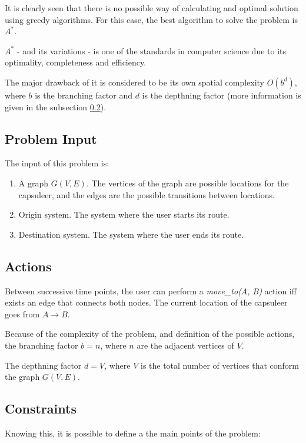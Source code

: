 \documentclass{article}
\theoremstyle{customdef}
\begin{document}
It is clearly seen that there is no possible way of calculating and optimal solution using greedy algorithms. For this case, the best algorithm to solve the problem is $A^*$.

$A^*$ - and its variations - is one of the standards in computer science due to its optimality, completeness and efficiency.

The major drawback of it is considered to be its own spatial complexity $O(b^d)$, where $b$ is the branching factor and $d$ is the depthning factor (more information is given in the subsection \ref{sec:actions}).

\subsection{Problem Input}

The input of this problem is:
\begin{enumerate}
    \item A graph $G(V,E)$. The vertices of the graph are possible locations for the capsuleer, and the edges are the possible transitions between locations.
    \item Origin system. The system where the user starts its route.
    \item Destination system. The system where the user ends its route.
\end{enumerate}

\subsection{Actions}\label{sec:actions}

Between successive time points, the user can perform a \textit{move\_to(A, B)} action iff exists an edge that connects both nodes. The current location of the capsuleer goes from $A \rightarrow B$.

Because of the complexity of the problem, and definition of the possible actions, the branching factor $b=n$, where $n$ are the adjacent vertices of $V$.

The depthning factor $d=V$, where $V$ is the total number of vertices that conform the graph $G(V,E)$.



\subsection{Constraints}

Knowing this, it is possible to define a the main points of the problem:
\end{document}

